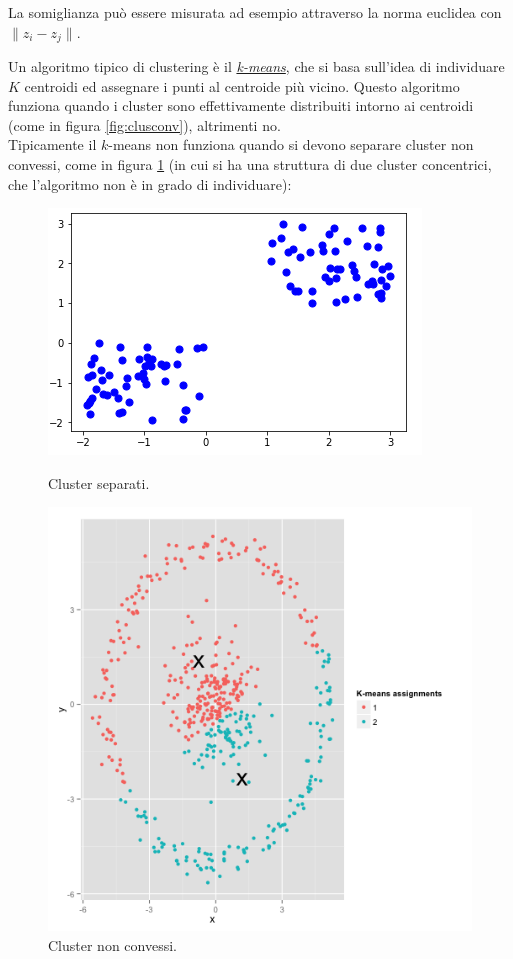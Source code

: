 La somiglianza pu\`o essere misurata ad esempio attraverso la norma euclidea con $\| z_i - z_j \|$.

Un algoritmo tipico di clustering \`e il \href{https://en.wikipedia.org/wiki/K-means_clustering}{\textit{k-means}}, che si basa sull'idea di individuare $K$ centroidi ed assegnare i punti al centroide pi\`u vicino. Questo algoritmo funziona quando i cluster sono effettivamente distribuiti intorno ai centroidi (come in figura \ref{fig:clusconv}), altrimenti no.\\
Tipicamente il $k$-means non funziona quando si devono separare cluster non convessi, come in figura \ref{fig:nonconv} (in cui si ha una struttura di due cluster concentrici, che l'algoritmo non \`e in grado di individuare):
\begin{figure}[!htbp]
  \centering
  \begin{minipage}[b]{0.4\textwidth}
    \includegraphics[scale=0.6]{img/kmeans2.png}
    \caption{Cluster separati.}
    \label{fig:clusconv}
  \end{minipage}
  \hfill
  \begin{minipage}[b]{0.4\textwidth}
    \includegraphics[width=\textwidth]{img/plot_kmeans-1.png}
    \caption{Cluster non convessi.}
    \label{fig:nonconv}
  \end{minipage}
\end{figure}


